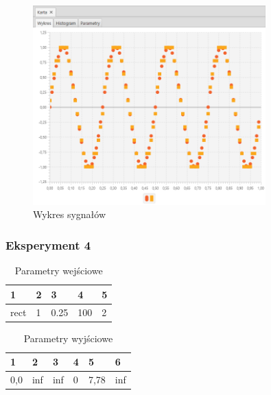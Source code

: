 \documentclass[12pt]{article}
\begin{document}
{{{                \begin{figure}[H]
                    \centering
                    \includegraphics[width=0.8\textwidth]{img/result/experiment5/03/data_draw_sampling_output_quant_output_200425.png}
                    \caption{Wykres sygnałów}
                \end{figure}
            }
            \newpage

            \subsubsection{Eksperyment 4} {
                \begin{table}[H]
                    \centering
                    \begin{tabular}{|l|l|l|l|l|}
                        \hline
                        1 & 2 & 3 & 4 & 5   \\ \hline
                        rect & 1 & 0.25 & 100 & 2  \\ \hline
                    \end{tabular}
                    \caption{Parametry wejściowe}
                \end{table}

                \begin{table}[H]
                    \centering
                    \begin{tabular}{|l|l|l|l|l|l|}
                        \hline
                        1 & 2 & 3 & 4 & 5 & 6  \\ \hline
                        0,0 & inf & inf & 0 & 7,78 & inf \\ \hline
                    \end{tabular}
                    \caption{Parametry wyjściowe}
                \end{table}


}}}
\end{document}
